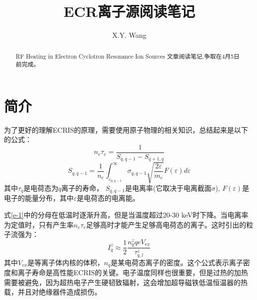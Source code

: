 \documentclass[fontset=windows]{article}
\title{ECR离子源阅读笔记}
\author{X.Y. Wang}
\begin{document}
\maketitle

\begin{abstract}
RF Heating in Electron Cyclotron Resonance Ion Sources 文章阅读笔记,争取在4月5日前完成。
\end{abstract}

\section{简介}
为了更好的理解ECRIS的原理，需要使用原子物理的相关知识，总结起来是以下的公式：
\begin{equation}
    n_e\tau_e=\frac{1}{S_{q,q-1}-S_{q+1,q}}
    \label{e-1}
\end{equation}
\begin{equation}
    S_{q,q-1}=\frac{1}{n_e}\int_{\varepsilon_{q,q-1}}^{\infty}\sigma_{q,q-1}\sqrt{\frac{2\varepsilon}{m_e}}F(\varepsilon)d\varepsilon
    \label{e-2}
\end{equation}
其中$\tau_q$是电荷态为$q$离子的寿命， $S_{q,q-1}$是电离率(它取决于电离截面$\sigma$), $F(\varepsilon)$是电子的能量分布，其中$\varepsilon$是电荷态的电离能。

式\ref{e-1}中的分母在低温时逐渐升高，但是当温度超过20-30 keV时下降。当电离率为定值时，只有产生率$n_e\tau_e$足够高时才能产生足够高电荷态的离子。这时引出的粒子流强为：
\begin{equation}
    I_q^z\approx\frac{1}{2}\frac{n_q^zqeV_{ex}}{\tau_{q,l}^z}
\end{equation}
其中$V_{ex}$是等离子体内核的体积，$n_q$是某电荷态离子的密度。这个公式表示离子密度和离子寿命是高性能ECRIS的关键。电子温度同样也很重要，但是过热的加热需要被避免，因为超热电子产生硬韧致辐射，这会增加超导磁铁低温恒温器的热载，并且对绝缘器件造成损伤。



\end{document}

